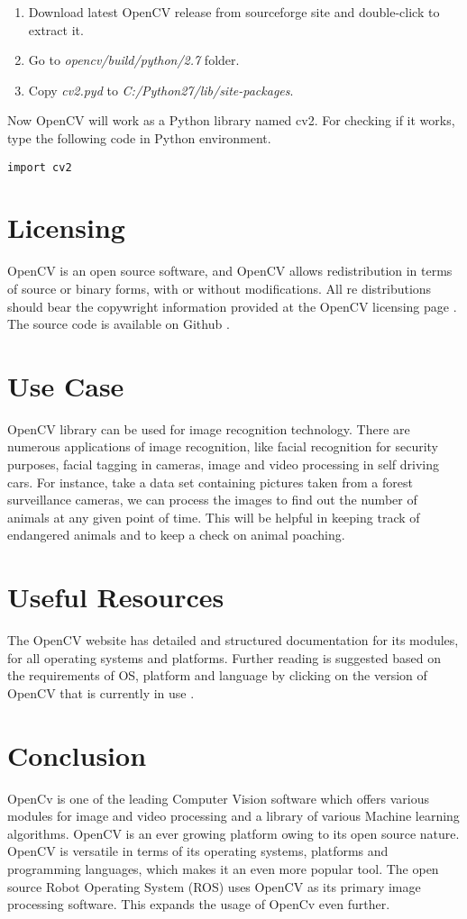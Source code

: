 \documentclass[9pt,twocolumn,twoside]{styles/osajnl}
\begin{document}
\begin{enumerate}
    \item Download latest OpenCV release from sourceforge site \cite{www-opencv-sf} and double-click to extract it.
    \item Go to \textit{opencv/build/python/2.7} folder.
    \item Copy \textit{cv2.pyd} to \textit{C:/Python27/lib/site-packages}. 
\end{enumerate}
Now OpenCV will work as a Python library named cv2. For checking if it works, type the following code in Python environment.
\begin{Verbatim}
import cv2
\end{Verbatim}
 

\section{Licensing}
OpenCV is an open source software, and OpenCV allows redistribution in terms of source or binary forms, with or without modifications. All re distributions should bear the copywright information provided at the OpenCV licensing page \cite{www-opencv-license}. The source code is available on Github \cite{www-git-opencv}.

\section{Use Case}
OpenCV library can be used for image recognition technology. There are numerous applications of image recognition, like facial recognition for security purposes, facial tagging in cameras, image and video processing in self driving cars. For instance, take a data set containing pictures taken from a forest surveillance cameras, we can process the images to find out the number of animals at any given point of time. This will be helpful in keeping track of endangered animals and to keep a check on animal poaching. 

\section{Useful Resources}
The OpenCV website has detailed and structured documentation for its modules, for all operating systems and platforms. Further reading is suggested based on the requirements of OS, platform and language by clicking on the version of OpenCV that is currently in use \cite{www-opencv-docs}. 
\section{Conclusion}
OpenCv is one of the leading Computer Vision software which offers various modules for image and video processing and a library of various Machine learning algorithms. OpenCV is an ever growing platform owing to its open source nature. OpenCV is versatile in terms of its operating systems, platforms and programming languages, which makes it an even more popular tool. The open source Robot Operating System (ROS) uses OpenCV as its primary image processing software. This expands the usage of OpenCv even further. 
\end{document}
